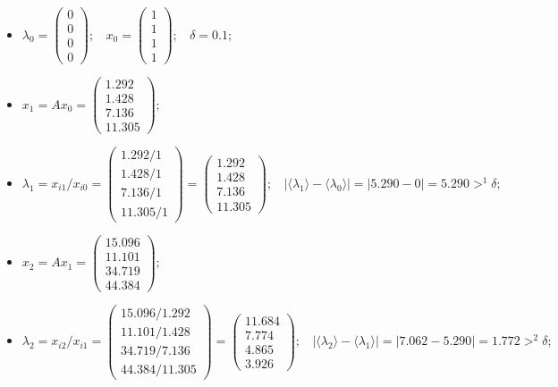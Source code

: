 \begin{itemize}
    \item
    $\lambda_0 =
    \begin{pmatrix}
        0\\0\\0\\0
    \end{pmatrix};~~~~
    x_0 =
    \begin{pmatrix}
        1\\1\\1\\1
    \end{pmatrix};~~~~
    \delta = 0.1;$



    \item
    $x_1 = Ax_0 =
    \begin{pmatrix}
        1.292\\1.428\\7.136\\11.305
    \end{pmatrix};$
    \item
    $\lambda_1 = x_{i1} / x_{i0} =
    \begin{pmatrix}
        1.292/1\\1.428/1\\7.136/1\\11.305/1
    \end{pmatrix} =
    \begin{pmatrix}
        1.292\\1.428\\7.136\\11.305
    \end{pmatrix};~~~~
    |\langle\lambda_1\rangle-\langle\lambda_0\rangle| = |5.290-0| = 5.290 >^1 \delta;$



    \item
    $x_2 = Ax_1 =
    \begin{pmatrix}
        15.096\\11.101\\34.719\\44.384
    \end{pmatrix};$
    \item
    $\lambda_2 = x_{i2} / x_{i1} =
    \begin{pmatrix}
        15.096/1.292\\11.101/1.428\\34.719/7.136\\44.384/11.305
    \end{pmatrix} =
    \begin{pmatrix}
        11.684\\7.774\\4.865\\3.926
    \end{pmatrix};~~~~
    |\langle\lambda_2\rangle-\langle\lambda_1\rangle| = |7.062-5.290| = 1.772 >^2 \delta;$




\end{itemize}
